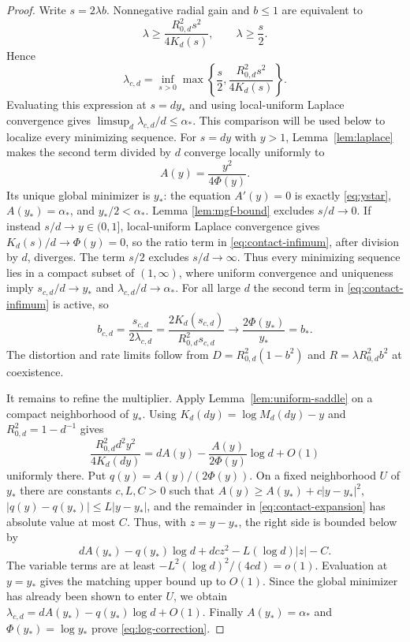 \documentclass[11pt,a4paper]{article}
\theoremstyle{remark}
\begin{document}
\begin{proof}
Write $s=2\lambda b$.  Nonnegative radial gain and $b\le1$ are equivalent to
\begin{equation}
 \lambda\ge \frac{R_{0,d}^2s^2}{4K_d(s)},
 \qquad \lambda\ge\frac{s}{2}.
\end{equation}
Hence
\begin{equation}
 \lambda_{c,d}=\inf_{s>0}
 \max\left\{\frac{s}{2},
 \frac{R_{0,d}^2s^2}{4K_d(s)}\right\}.
 \label{eq:contact-infimum}
\end{equation}
Evaluating this expression at $s=dy_*$ and using local-uniform Laplace
convergence gives $\limsup_d\lambda_{c,d}/d\le\alpha_*$.  This comparison
will be used below to localize every minimizing sequence.
For $s=dy$ with $y>1$, Lemma~\ref{lem:laplace} makes the second term divided
by $d$ converge locally uniformly to
\begin{equation}
 A(y)=\frac{y^2}{4\Phi(y)}.
\end{equation}
Its unique global minimizer is $y_*$: the equation $A'(y)=0$ is exactly
\eqref{eq:ystar}, $A(y_*)=\alpha_*$, and $y_*/2<\alpha_*$.  Lemma
\ref{lem:mgf-bound} excludes $s/d\to0$.  If instead
$s/d\to y\in(0,1]$, local-uniform Laplace convergence gives
$K_d(s)/d\to\Phi(y)=0$, so the ratio term in
\eqref{eq:contact-infimum}, after division by $d$, diverges.  The term $s/2$
excludes $s/d\to\infty$.  Thus every minimizing sequence lies in a compact
subset of $(1,\infty)$, where uniform convergence and uniqueness imply
$s_{c,d}/d\to y_*$ and $\lambda_{c,d}/d\to\alpha_*$.  For all large $d$ the
second term in \eqref{eq:contact-infimum} is active, so
\begin{equation}
 b_{c,d}=\frac{s_{c,d}}{2\lambda_{c,d}}
 =\frac{2K_d(s_{c,d})}{R_{0,d}^2s_{c,d}}
 \longrightarrow\frac{2\Phi(y_*)}{y_*}=b_*.
\end{equation}
The distortion and rate limits follow from
$D=R_{0,d}^2(1-b^2)$ and $R=\lambda R_{0,d}^2b^2$ at coexistence.

It remains to refine the multiplier.  Apply
Lemma~\ref{lem:uniform-saddle} on a compact neighborhood of $y_*$.
Using $K_d(dy)=\log M_d(dy)-y$ and $R_{0,d}^2=1-d^{-1}$ gives
\begin{equation}
 \frac{R_{0,d}^2d^2y^2}{4K_d(dy)}
 =dA(y)-\frac{A(y)}{2\Phi(y)}\log d+O(1)
 \label{eq:contact-expansion}
\end{equation}
uniformly there.  Put $q(y)=A(y)/(2\Phi(y))$.  On a fixed neighborhood $U$
of $y_*$ there are constants $c,L,C>0$ such that
$A(y)\ge A(y_*)+c|y-y_*|^2$, $|q(y)-q(y_*)|\le L|y-y_*|$, and the remainder
in \eqref{eq:contact-expansion} has absolute value at most $C$.  Thus, with
$z=y-y_*$, the right side is bounded below by
\begin{equation}
 dA(y_*)-q(y_*)\log d+dc z^2-L(\log d)|z|-C.
\end{equation}
The variable terms are at least
$-L^2(\log d)^2/(4cd)=o(1)$.  Evaluation at $y=y_*$ gives the matching upper
bound up to $O(1)$.  Since the global minimizer has already been shown to
enter $U$, we obtain
$\lambda_{c,d}=dA(y_*)-q(y_*)\log d+O(1)$.  Finally
$A(y_*)=\alpha_*$ and $\Phi(y_*)=\log y_*$ prove
\eqref{eq:log-correction}.
\end{proof}
\end{document}
